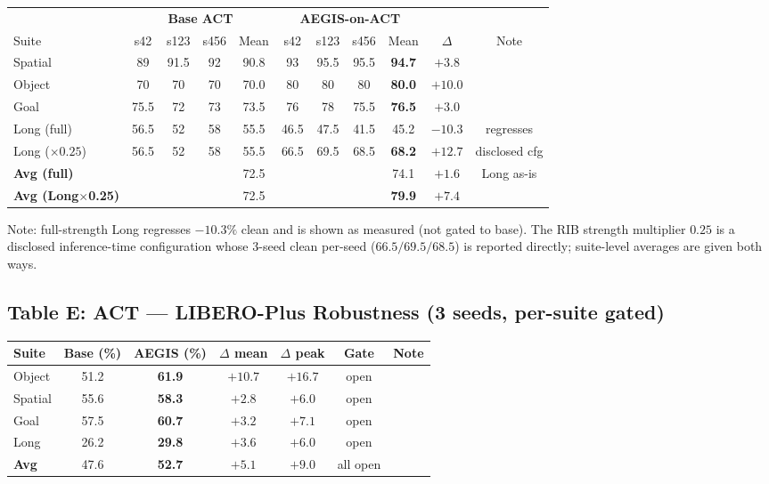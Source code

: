 \documentclass[11pt,a4paper]{article}
\newcommand{\win}[1]{{\color{frozengreen}\textbf{#1}}}
\begin{document}
\begin{table}[H]
\centering
\small
\begin{tabular}{lcccc|cccc|cc}
\toprule
& \multicolumn{4}{c|}{\textbf{Base ACT}} & \multicolumn{4}{c|}{\textbf{AEGIS-on-ACT}} & & \\
Suite & s42 & s123 & s456 & Mean & s42 & s123 & s456 & Mean & $\Delta$ & Note \\
\midrule
Spatial & 89 & 91.5 & 92 & 90.8 & 93 & 95.5 & 95.5 & \win{94.7} & $+3.8$ & \\
Object  & 70 & 70 & 70 & 70.0 & 80 & 80 & 80 & \win{80.0} & $+10.0$ & \\
Goal    & 75.5 & 72 & 73 & 73.5 & 76 & 78 & 75.5 & \win{76.5} & $+3.0$ & \\
Long (full)  & 56.5 & 52 & 58 & 55.5 & 46.5 & 47.5 & 41.5 & 45.2 & $-10.3$ & regresses \\
Long ($\times0.25$) & 56.5 & 52 & 58 & 55.5 & 66.5 & 69.5 & 68.5 & \win{68.2} & $+12.7$ & disclosed cfg \\
\midrule
\textbf{Avg (full)}       & & & & 72.5 & & & & 74.1 & $+1.6$ & Long as-is \\
\textbf{Avg (Long$\times$0.25)} & & & & 72.5 & & & & \win{79.9} & $+7.4$ & \\
\bottomrule
\end{tabular}
\end{table}
{\small Note: full-strength Long regresses $-10.3\%$ clean and is shown as measured (not gated
to base). The RIB strength multiplier $0.25$ is a disclosed inference-time configuration whose
3-seed clean per-seed ($66.5/69.5/68.5$) is reported directly; suite-level averages are given
both ways.}

\subsection*{Table E: ACT — LIBERO-Plus Robustness (3 seeds, per-suite gated)}

\begin{table}[H]
\centering
\small
\begin{tabular}{lcc|cc|cc}
\toprule
Suite & Base (\%) & AEGIS (\%) & $\Delta$ mean & $\Delta$ peak & Gate & Note \\
\midrule
Object  & 51.2 & \win{61.9} & $+10.7$ & $+16.7$ & open & \\
Spatial & 55.6 & \win{58.3} & $+2.8$  & $+6.0$  & open & \\
Goal    & 57.5 & \win{60.7} & $+3.2$  & $+7.1$  & open & \\
Long    & 26.2 & \win{29.8} & $+3.6$  & $+6.0$  & open & \\
\midrule
\textbf{Avg} & 47.6 & \win{52.7} & $+5.1$ & $+9.0$ & all open & \\
\bottomrule
\end{tabular}
\end{table}
\end{document}
